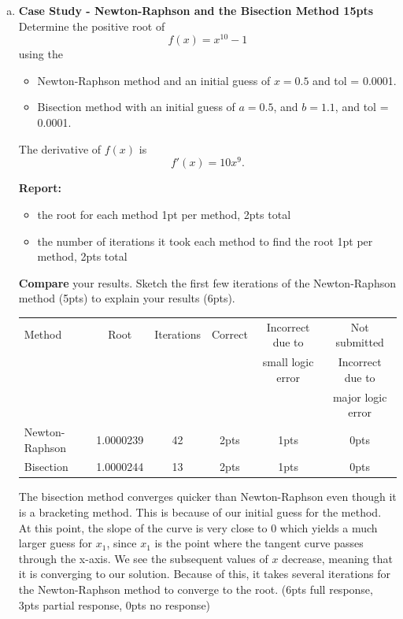 \documentclass[11pt]{article}
\begin{document}
\begin{enumerate}[(c)]
	\item \textbf{Case Study - Newton-Raphson and the Bisection Method \color{red} 15pts}\\
	Determine the positive root of $$f(x) = x^{10} - 1$$ using the 
	\begin{itemize}
		\item Newton-Raphson method and an initial guess of $x = 0.5$ and tol = 0.0001.
		\item Bisection method with an initial guess of $a = 0.5$, and $b = 1.1$, and tol = 0.0001.
	\end{itemize}
    The derivative of $f(x)$ is $$f'(x) = 10x^9.$$
   
	\textbf{Report:}
	\begin{itemize}
		\item the root for each method \color{red} 1pt per method, 2pts total \color{black}
		\item the number of iterations it took each method to find the root \color{red} 1pt per method, 2pts total
	\end{itemize}
	\textbf{Compare} your results. Sketch the first few iterations of the Newton-Raphson method \color{red}(5pts) \color{black}to explain your results \color{red}(6pts).
	\begin{table}[H]
		\centering
		\color{red}
		\begin{tabular}{| l | c | c | c | c | c |}
			\hline
			Method & Root & Iterations & Correct & Incorrect due to & Not submitted\\
			&        &            &                  &  small logic error & Incorrect due to \\
			&        &            &                  &                    & major logic error \\
			\hline
			Newton-Raphson  & 1.0000239 & 42 & 2pts & 1pts & 0pts\\
			\hline
			Bisection &  1.0000244 & 13 & 2pts & 1pts & 0pts\\
			\hline
		\end{tabular}
	\end{table}
	\color{red} The bisection method converges quicker than Newton-Raphson even though it is a bracketing method. This is because of our initial guess for the method. At this point, the slope of the curve is very close to 0 which yields a much larger guess for $x_1$, since $x_1$ is the point where the tangent curve passes through the x-axis. We see the subsequent values of $x$ decrease, meaning that it is converging to our solution. Because of this, it takes several iterations for the Newton-Raphson method to converge to the root. (6pts full response, 3pts partial response, 0pts no response)

\end{enumerate}
\end{document}
